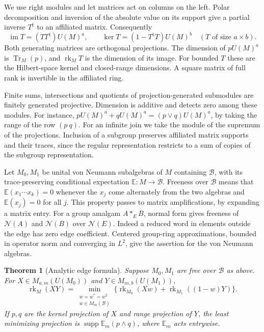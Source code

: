 \documentclass[11pt,a4paper,reqno]{amsart}
\numberwithin{equation}{section}
\newtheorem{theorem}{Theorem}[section]
\theoremstyle{remark}
\newcommand{\N}{\mathcal N}
\newcommand{\Tr}{\operatorname{Tr}}
\newcommand{\rk}{\operatorname{rk}}
\newcommand{\im}{\operatorname{im}}
\DeclareMathOperator{\supp}{supp}
\begin{document}
We use right modules and let matrices act on columns on the left. Polar decomposition and inversion of the absolute value on its support give a partial inverse \(T^\dagger\) to an affiliated matrix. Consequently
\[
       \im T=(TT^\dagger)U(M)^a,\qquad
       \ker T=(1-T^\dagger T)U(M)^b
       \quad (T\text{ of size }a\times b).
\]
Both generating matrices are orthogonal projections. The dimension of \(pU(M)^a\) is \(\Tr_M(p)\), and \(\rk_M T\) is the dimension of its image. For bounded \(T\) these are the Hilbert-space kernel and closed-range dimensions. A square matrix of full rank is invertible in the affiliated ring.

Finite sums, intersections and quotients of projection-generated submodules are finitely generated projective. Dimension is additive and detects zero among these modules. For instance, \(pU(M)^a+qU(M)^a=(p\vee q)U(M)^a\), by taking the range of the row \((p\ q)\). For an infinite join we take the module of the supremum of the projections. Inclusion of a subgroup preserves affiliated matrix supports and their traces, since the regular representation restricts to a sum of copies of the subgroup representation.

Let \(M_0,M_1\) be unital von Neumann subalgebras of \(M\) containing \(\mathcal B\), with its trace-preserving conditional expectation \(\mathbb E:M\to\mathcal B\). Freeness over \(\mathcal B\) means that \(\mathbb E(x_1\cdots x_k)=0\) whenever the \(x_j\) come alternately from the two algebras and \(\mathbb E(x_j)=0\) for all \(j\). This property passes to matrix amplifications, by expanding a matrix entry. For a group amalgam \(A*_E B\), normal form gives freeness of \(\N(A)\) and \(\N(B)\) over \(\N(E)\). Indeed a reduced word in elements outside the edge has zero edge coefficient. Centered group-ring approximations, bounded in operator norm and converging in \(L^2\), give the assertion for the von Neumann algebras.

\begin{theorem}[Analytic edge formula]\label{thm:B}
Suppose \(M_0,M_1\) are free over \(\mathcal B\) as above. For
\(X\in M_{a,m}(U(M_0))\) and \(Y\in M_{m,b}(U(M_1))\),
\begin{equation}\label{eq:analytic}
 \rk_M(XY)=\min_{\substack{w=w^*=w^2\\ w\in M_m(\mathcal B)}}
       \big\{\rk_{M_0}(Xw)+\rk_{M_1}((1-w)Y)\big\}.
\end{equation}
If \(p,q\) are the kernel projection of \(X\) and range projection of \(Y\), the least minimizing projection is \(\supp\mathbb E_m(p\wedge q)\), where \(\mathbb E_m\) acts entrywise.
\end{theorem}
\end{document}
